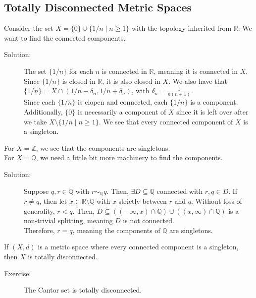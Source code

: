 \documentclass[10pt]{extarticle}
\newcommand{\Q}{\mathbb{Q}}
\newcommand{\Z}{\mathbb{Z}}
\newcommand{\R}{\mathbb{R}}
\begin{document}
  \subsection{Totally Disconnected Metric Spaces}%
  Consider the set $X = \{0\} \cup \{1/n\mid n\geq 1\}$ with the topology inherited from $\R$. We want to find the connected components.
  \begin{description}
    \item[Solution:] The set $\{1/n\}$ for each $n$ is connected in $\R$, meaning it is connected in $X$. Since $\{1/n\}$ is closed in $\R$, it is also closed in $X$. We also have that $\{1/n\} = X\cap (1/n - \delta_n,1/n + \delta_n)$, with $\delta_n = \frac{1}{n(n+1)}$.\\

      Since each $\{1/n\}$ is clopen and connected, each $\{1/n\}$ is a component. Additionally, $\{0\}$ is necessarily a component of $X$ since it is left over after we take $X \setminus \{1/n\mid n\geq 1\}$. We see that every connected component of $X$ is a singleton.
  \end{description}
  For $X=\Z$, we see that the components are singletons.\\

  For $X = \Q$, we need a little bit more machinery to find the components.
  \begin{description}
    \item[Solution:] Suppose $q,r\in\Q$ with $r\sim_{\Q}q$. Then, $\exists D\subseteq \Q$ connected with $r,q\in D$. If $r\neq q$, then let $x\in \R\setminus \Q$ with $x$ strictly between $r$ and $q$. Without loss of generality, $r < q$. Then, $D\subseteq \left((-\infty,x)\cap \Q\right) \cup \left((x,\infty)\cap \Q\right)$ is a non-trivial splitting, meaning $D$ is not connected.\\

      Therefore, $r = q$, meaning the components of $\Q$ are singletons.
  \end{description}
  If $(X,d)$ is a metric space where every connected component is a singleton, then $X$ is totally disconnected.
  \begin{description}
    \item[Exercise:] The Cantor set is totally disconnected.
  \end{description}
\end{document}
